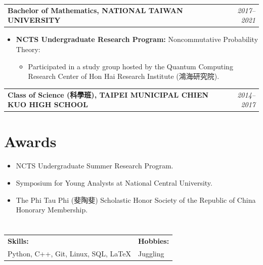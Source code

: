 \documentclass[a4paper,10pt]{article}
\begin{document}
\noindent
\begin{tabularx}{\textwidth}{Xr}
    \textbf{Bachelor of Mathematics, NATIONAL TAIWAN UNIVERSITY} & \textit{2017--2021} \\
\end{tabularx}
\begin{itemize}[leftmargin=30pt]
    \item \textbf{NCTS Undergraduate Research Program:} Noncommutative Probability Theory:
    \begin{itemize}
        \item Participated in a study group hosted by the Quantum Computing Research Center of Hon Hai Research Institute (鴻海研究院).
    \end{itemize}
\end{itemize}

\noindent
\begin{tabularx}{\textwidth}{Xr}
    \textbf{Class of Science (科學班), TAIPEI MUNICIPAL CHIEN KUO HIGH SCHOOL} & \textit{2014--2017} \\
\end{tabularx}

\section*{Awards}
\begin{itemize}[leftmargin=30pt]
    \item NCTS Undergraduate Summer Research Program.
    \item Symposium for Young Analysts at National Central University.
    \item The Phi Tau Phi (斐陶斐) Scholastic Honor Society of the Republic of China Honorary Membership.
\end{itemize}

\section*{}
\begin{tabularx}{\textwidth}{X X}
    \textbf{Skills:} & \textbf{Hobbies:} \\
    Python, C++, Git, Linux, SQL, \LaTeX & Juggling \\
\end{tabularx}
\end{document}
